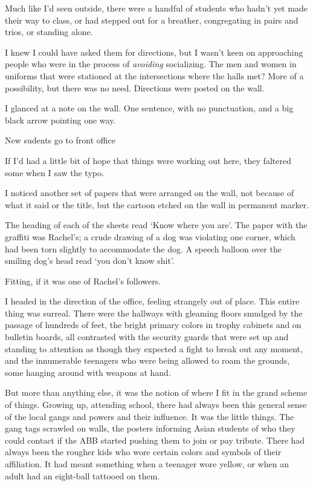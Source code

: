 Much like I'd seen outside, there were a handful of students who hadn't yet made their way to class, or had stepped out for a breather, congregating in pairs and trios, or standing alone.



I knew I could have asked them for directions, but I wasn't keen on approaching people who were in the process of \emph{avoiding }socializing.  The men and women in uniforms that were stationed at the intersections where the halls met?  More of a possibility, but there was no need.  Directions were posted on the wall.



I glanced at a note on the wall.  One sentence, with no punctuation, and a big black arrow pointing one way.



New sudents go to front office



If I'd had a little bit of hope that things were working out here, they faltered some when I saw the typo.



I noticed another set of papers that were arranged on the wall, not because of what it said or the title, but the cartoon etched on the wall in permanent marker.



The heading of each of the sheets read `Know where you are'.  The paper with the graffiti was Rachel's; a crude drawing of a dog was violating one corner, which had been torn slightly to accommodate the dog.  A speech balloon over the smiling dog's head read `you don't know shit'.



Fitting, if it was one of Rachel's followers.



I headed in the direction of the office, feeling strangely out of place.  This entire thing was surreal.  There were the hallways with gleaming floors smudged by the passage of hundreds of feet, the bright primary colors in trophy cabinets and on bulletin boards, all contrasted with the security guards that were set up and standing to attention as though they expected a fight to break out any moment, and the innumerable teenagers who were being allowed to roam the grounds, some hanging around with weapons at hand.



But more than anything else, it was the notion of where I fit in the grand scheme of things.  Growing up, attending school, there had always been this general sense of the local gangs and powers and their influence.  It was the little things.  The gang tags scrawled on walls, the posters informing Asian students of who they could contact if the ABB started pushing them to join or pay tribute.  There had always been the rougher kids who wore certain colors and symbols of their affiliation.  It had meant something when a teenager wore yellow, or when an adult had an eight-ball tattooed on them.



